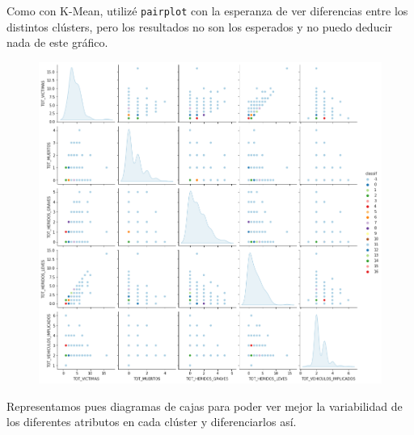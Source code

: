 \documentclass[a4]{article}
\begin{document}
Como con K-Mean, utilizé \texttt{pairplot} con la esperanza de ver diferencias entre los distintos clústers, pero los resultados no son los esperados y no puedo deducir nada de este gráfico.

\begin{figure}[H]
  \centering
  \includegraphics[width=171mm]{imagenes/c1_dbscan_pairplot}
\end{figure}

Representamos pues diagramas de cajas para poder ver mejor la variabilidad de los diferentes atributos en cada clúster y diferenciarlos así.
\end{document}
